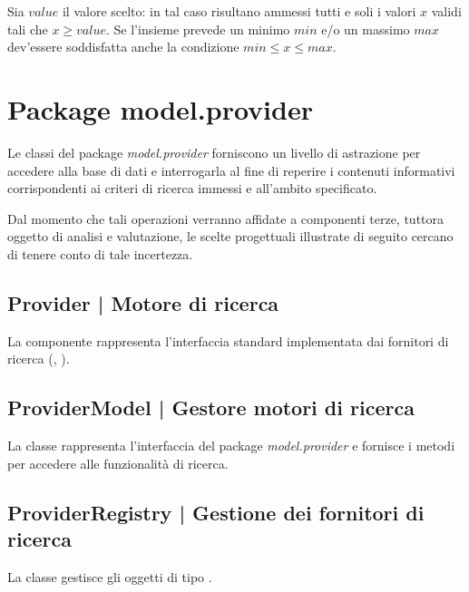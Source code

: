 \documentclass[10pt,a4paper,headinclude,footinclude,hidelinks]{scrreprt} %
\begin{document}
	Sia $value$ il valore scelto: in tal caso risultano ammessi tutti e soli i valori $x$ validi tali che $x \geq value$. Se l'insieme prevede un minimo $min$ e/o un massimo $max$ dev'essere soddisfatta anche la condizione $min \leq x \leq max$.

	\section{Package model.provider}
	\label{sec:stage:design:sistema:model.provider}
	Le classi del package \textit{model.provider} forniscono un livello di astrazione per accedere alla base di dati e interrogarla al fine di reperire i contenuti informativi corrispondenti ai criteri di ricerca immessi e all'ambito specificato.

	Dal momento che tali operazioni verranno affidate a componenti terze, tuttora oggetto di analisi e valutazione, le scelte progettuali illustrate di seguito cercano di tenere conto di tale incertezza.

	\subsection[Provider]{Provider | Motore di ricerca}
	\label{sec:stage:design:sistema:model.search:search-provider}
	La componente rappresenta l'interfaccia standard implementata dai fornitori di ricerca (\textit{}, \textit{}).

	\subsection[ProviderModel]{ProviderModel | Gestore motori di ricerca}
	\label{sec:stage:design:sistema:model.search:provider-model}
	La classe \textit{} rappresenta l'interfaccia del package \textit{model.provider} e fornisce i metodi per accedere alle funzionalità di ricerca.

	\subsection[ProviderRegistry]{ProviderRegistry | Gestione dei fornitori di ricerca}
	\label{sec:stage:design:sistema:model.search:provider-registry}
	La classe \textit{} gestisce gli oggetti di tipo \textit{}.
\end{document}
